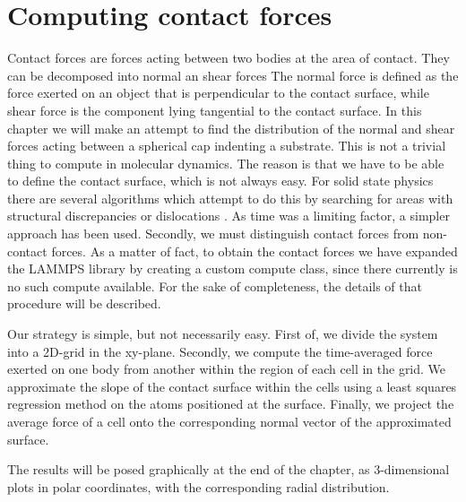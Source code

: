 \documentclass[twoside,english]{uiofysmaster}
\begin{document}
\chapter{Computing contact forces} \label{chp:contactForces}
Contact forces are forces acting between two bodies at the area of contact. 
They can be decomposed into normal an shear forces 
The normal force is defined as the force exerted on an object that is perpendicular to the contact surface, while shear force is the component lying tangential to the contact surface.
In this chapter we will make an attempt to find the distribution of the normal and shear forces acting between a spherical cap indenting a substrate. 
This is not a trivial thing to compute in molecular dynamics. 
The reason is that we have to be able to define the contact surface, which is not always easy. 
For solid state physics there are several algorithms which attempt to do this by searching for areas with structural discrepancies or dislocations \cite{stukowski}. 
As time was a limiting factor, a simpler approach has been used. 
Secondly, we must distinguish contact forces from non-contact forces. 
As a matter of fact, to obtain the contact forces we have expanded the LAMMPS library by creating a custom compute class, since there currently is no such compute available. 
For the sake of completeness, the details of that procedure will be described.

Our strategy is simple, but not necessarily easy. 
First of, we divide the system into a 2D-grid in the xy-plane. 
Secondly,  we compute the time-averaged force exerted on one body from another within the region of each cell in the grid. 
We approximate the slope of the contact surface within the cells using a least squares regression method on the atoms positioned at the surface. 
Finally, we project the average force of a cell onto the corresponding normal vector of the approximated surface.

The results will be posed graphically at the end of the chapter, as 3-dimensional plots in polar coordinates, with the corresponding radial distribution. 
\end{document}
